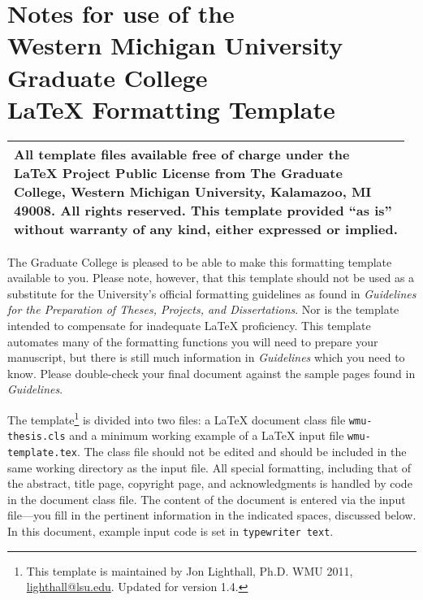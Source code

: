\documentclass{wmu-thesis}
\begin{document}
\singlespace
\chapter*{Notes for use of the \\Western Michigan University\\ Graduate College\\ \texorpdfstring{\LaTeX{}}{LaTeX} Formatting Template}
\begin{center}
\begin{tabular}{|p{0.97\linewidth}|}
\hline
All template files %
available free of charge under the \LaTeX{} Project Public License from The Graduate College, Western Michigan University, Kalamazoo, MI  49008.  All rights reserved.  %
 This template provided ``as is'' without warranty of any kind, either expressed or implied.\\
\hline
\end{tabular}
\end{center}

The Graduate College is pleased to be able to make this formatting template available to you.  Please note, however, that this template should not be used as a substitute for the University's official formatting guidelines as found in \textit{Guidelines for the Preparation of Theses, Projects, and Dissertations}.  Nor is the template intended to compensate for inadequate \LaTeX{} proficiency.  This template automates many of the formatting functions you will need to prepare your manuscript, but there is still much information in \textit{Guidelines} which you need to know.  Please double-check your final document against the sample pages found in \textit{Guidelines}.

\renewcommand{\thefootnote}{\fnsymbol{footnote}}

The template\footnote{This template is maintained by Jon Lighthall, Ph.D. WMU 2011, \href{mailto:lighthall@lsu.edu}{lighthall@lsu.edu}. Updated for version 1.4.}
is divided into two files: a \LaTeX{} document class file \texttt{wmu-thesis.cls} and a minimum working example of a \LaTeX{} input file \texttt{wmu-template.tex}.  The class file should not be edited and should be included in the same working directory as the input file.  All special formatting, including that of the abstract, title page, copyright page, and acknowledgments is handled by code in the document class file.  The content of the document is entered via the input file---you fill in the pertinent information in the indicated spaces, discussed below.  In this document, example input code is set in \texttt{typewriter text}.  
\end{document}

